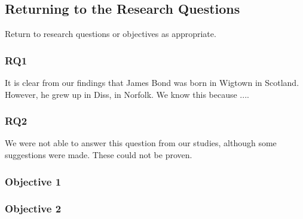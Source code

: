 \subsection{Returning to the Research Questions}
Return to research questions or objectives as appropriate. 

\subsubsection{RQ1}
It is clear from our findings that James Bond was born in Wigtown in Scotland. However, he grew up in Diss, in Norfolk. 
We know this because ....


\subsubsection{RQ2}
We were not able to answer this question from our studies, although some suggestions were made. These could not be proven. 

\subsubsection{Objective 1}


\subsubsection{Objective 2}